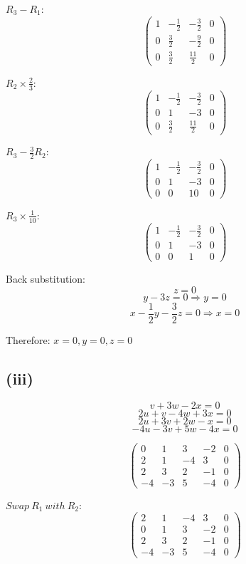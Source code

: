 \documentclass[12pt]{article}
\begin{document}
$R_3 - R_1$:
\[
	\begin{pmatrix}
		1 & -\frac{1}{2} & -\frac{3}{2} & 0 \\
		0 & \frac{3}{2}  & -\frac{9}{2} & 0 \\
		0 & \frac{3}{2}  & \frac{11}{2} & 0
	\end{pmatrix}
\]

$R_2 \times \frac{2}{3}$:
\[
	\begin{pmatrix}
		1 & -\frac{1}{2} & -\frac{3}{2} & 0 \\
		0 & 1           & -3           & 0 \\
		0 & \frac{3}{2}  & \frac{11}{2} & 0
	\end{pmatrix}
\]

$R_3 - \frac{3}{2}R_2$:
\[
	\begin{pmatrix}
		1 & -\frac{1}{2} & -\frac{3}{2} & 0 \\
		0 & 1           & -3           & 0 \\
		0 & 0           & 10           & 0
	\end{pmatrix}
\]

$R_3 \times \frac{1}{10}$:
\[
	\begin{pmatrix}
		1 & -\frac{1}{2} & -\frac{3}{2} & 0 \\
		0 & 1           & -3           & 0 \\
		0 & 0           & 1            & 0
	\end{pmatrix}
\]

Back substitution:
\[
	z = 0
\]
\[
	y - 3z = 0 \Rightarrow y = 0
\]
\[
	x - \frac{1}{2}y - \frac{3}{2}z = 0 \Rightarrow x = 0
\]

Therefore: $x = 0, y = 0, z = 0$

\subsection*{(iii)}
\[
	v + 3w - 2x = 0
\]
\[
	2u + v - 4w + 3x = 0
\]
\[
	2u + 3v + 2w - x = 0
\]
\[
	-4u - 3v + 5w - 4x = 0
\]

\[
	\begin{pmatrix}
		0  & 1  & 3  & -2 & 0 \\
		2  & 1  & -4 & 3  & 0 \\
		2  & 3  & 2  & -1 & 0 \\
		-4 & -3 & 5  & -4 & 0
	\end{pmatrix}
\]

$Swap\ R_1\ with\ R_2$:
\[
	\begin{pmatrix}
		2  & 1  & -4 & 3  & 0 \\
		0  & 1  & 3  & -2 & 0 \\
		2  & 3  & 2  & -1 & 0 \\
		-4 & -3 & 5  & -4 & 0
	\end{pmatrix}
\]
\end{document}
